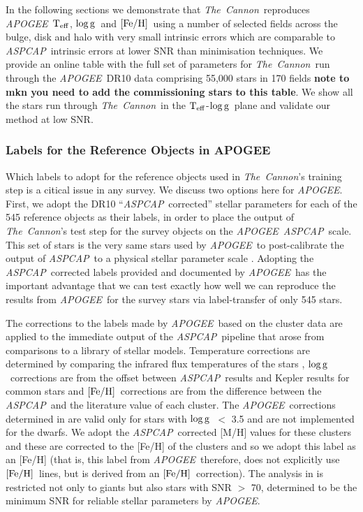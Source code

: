 \documentclass[12pt, preprint]{aastex}
\newcommand{\teff}{\mbox{$\rm T_{eff}$}}
\newcommand{\feh}{\mbox{$\rm [Fe/H]$}}
\newcommand{\logg}{\mbox{$\rm \log g$}}
\newcommand{\tc}{\textsl{The~Cannon}}
\newcommand{\apogee}{\textsl{APOGEE}}
\newcommand{\aspcap}{\textsl{ASPCAP}}
\begin{document}

In the following sections we demonstrate that \tc\ reproduces \apogee\ \teff, \logg\ and \feh\ using a number of selected fields across the bulge, disk and halo with very small intrinsic errors which are comparable to \aspcap\ intrinsic errors at lower SNR than minimisation techniques. 
We provide an online table with the full set of parameters for \tc\ run through the \apogee\ DR10 data comprising 55,000 stars in 170 fields \textbf{note to mkn you need to add the commissioning stars to this table}.  
We show all the stars run through \tc\ in the \teff-\logg\ plane and validate our method at low SNR.

\subsubsection{Labels for the Reference Objects in APOGEE}\label{sec:RefLabels}

Which labels to adopt for the reference objects used in \tc 's training step is a citical issue
in any survey. We discuss two options here for \apogee . 
First, we adopt the DR10 ``\aspcap\ corrected'' stellar parameters for each of the 545 reference objects as their labels, in order to place the output of \tc 's test step for the survey objects on the \apogee\ \aspcap\ scale.
 This set of stars is the very same stars used by \apogee\ to post-calibrate the output of \aspcap\ to a physical stellar parameter scale \citep{Meszaros2013}.
Adopting the \aspcap\ corrected labels provided and documented by \apogee\ has the important advantage 
that we can test exactly how well we can reproduce the results from \apogee\ for the survey stars via label-transfer of only 545 stars.

The corrections to the labels made by \apogee\ based on the cluster data are applied to the immediate output of the \aspcap\ pipeline that arose from comparisons to a library of stellar models.
Temperature corrections are determined by comparing the infrared flux temperatures of the stars \citep{gonzalez2009}, \logg\ corrections are from the offset between \aspcap\ results and Kepler results for common stars and \feh\ corrections are from the difference between the \aspcap\ and  the literature value of each cluster.  
The \apogee\ corrections determined in \citet{Meszaros2013} are valid only for stars with \logg\ $<$ 3.5 and are not implemented for the dwarfs.  We adopt the \aspcap\ corrected [M/H] values for these clusters and these are corrected to the [Fe/H] of the clusters and so we adopt this label as an [Fe/H] (that is, this label from \apogee\ therefore, does not explicitly use \feh\ lines, but is derived from an \feh\ correction). 
The analysis in \citet{Meszaros2013} is restricted not only to giants but also stars with SNR $>$ 70, determined to be the minimum SNR for reliable stellar parameters by \apogee.
\end{document}
